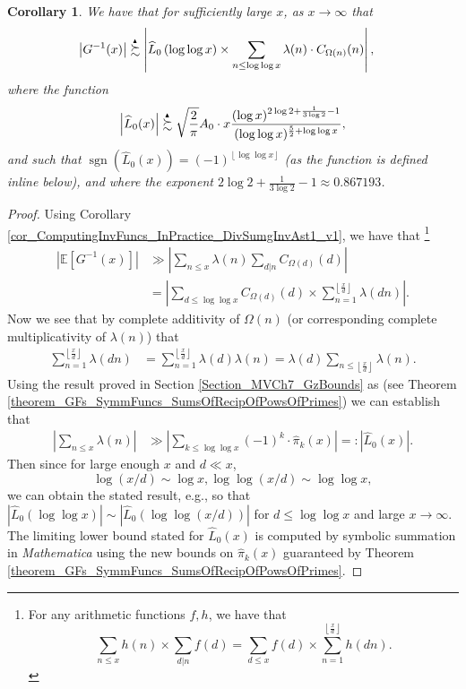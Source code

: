 \documentclass[11pt,reqno,a4letter]{article}
\numberwithin{figure}{section}
\numberwithin{table}{section}
\newcommand{\cf}{\textit{cf.\ }}
\newcommand{\floor}[1]{\left\lfloor #1 \right\rfloor}
\newcommand{\Floor}[2]{\ensuremath{\left\lfloor \frac{#1}{#2} \right\rfloor}}
\theoremstyle{plain}
\newtheorem{cor}[theorem]{Corollary}
\numberwithin{theorem}{section}
\theoremstyle{definition}
\newcommand{\NBRef}[1]{}
\newcommand{\SuccSim}[0]{\overset{_{\scriptsize{\blacktriangle}}}{\succsim}}
\begin{document}
\begin{cor} 
\label{cor_ASemiForm_ForGInvx_v1} 
We have that for sufficiently large $x$, as $x \rightarrow \infty$ that 
\begin{align*} 
\left\lvert G^{-1}(x) \right\rvert & \SuccSim 
     \left\lvert 
     \widehat{L}_0\left(\log\log x\right) \times \sum_{n \leq \log\log x} 
     \lambda(n) \cdot C_{\Omega(n)}(n) \right\rvert, 
\end{align*} 
where the function 
\[
\left\lvert \widehat{L}_0(x) \right\rvert \SuccSim 
     \sqrt{\frac{2}{\pi}} A_0 \cdot x 
     \frac{(\log x)^{2\log 2+ \frac{1}{3 \log 2} - 1}}{ 
     (\log\log x)^{\frac{5}{2} + \log\log x}}, 
\]
and such that $\operatorname{sgn}(\widehat{L}_0(x)) = (-1)^{\floor{\log\log x}}$ 
(as the function is defined inline below), and 
where the exponent $2\log 2+ \frac{1}{3 \log 2} - 1 \approx 0.867193$. 
\end{cor} 
\NBRef{A10-2020.04-26} 
\begin{proof} 
Using Corollary \ref{cor_ComputingInvFuncs_InPractice_DivSumgInvAst1_v1}, we have that \footnote{ 
     For any arithmetic functions $f,h$, we have that \cite[\cf \S 3.10; \S 3.12]{APOSTOLANUMT} 
     \[
     \sum_{n \leq x} h(n) \times \sum_{d|n} f(d) = \sum_{d \leq x} f(d) \times \sum_{n=1}^{\Floor{x}{d}} h(dn). 
     \] 
}
\begin{align*} 
\left\lvert \mathbb{E}[G^{-1}(x)] \right\rvert & \gg 
     \left\lvert \sum_{n \leq x} \lambda(n) \sum_{d|n} C_{\Omega(d)}(d) \right\rvert \\ 
     & = \left\lvert \sum_{d \leq \log\log x} C_{\Omega(d)}(d) \times 
     \sum_{n=1}^{\Floor{x}{d}} \lambda(dn) \right\rvert. 
\end{align*} 
Now we see that by complete additivity of $\Omega(n)$ 
(or corresponding complete multiplicativity of $\lambda(n)$) that 
\begin{align*} 
\sum_{n=1}^{\Floor{x}{d}} \lambda(dn) & = \sum_{n=1}^{\Floor{x}{d}} \lambda(d) \lambda(n) 
     = \lambda(d) \sum_{n \leq \Floor{x}{d}} \lambda(n). 
\end{align*} 
Using the result proved in Section \ref{Section_MVCh7_GzBounds} as 
(see Theorem \ref{theorem_GFs_SymmFuncs_SumsOfRecipOfPowsOfPrimes})
we can establish that 
\begin{align*} 
\left\lvert \sum_{n \leq x} \lambda(n) \right\rvert & \gg 
     \left\lvert \sum_{k \leq \log\log x} (-1)^k \cdot \widehat{\pi}_k(x) \right\rvert 
     =: \left\lvert \widehat{L}_0(x) \right\rvert. 
\end{align*} 
Then since for large enough $x$ and $d \ll x$, 
\[
\log(x/d) \sim \log x, \log\log(x/d) \sim \log\log x, 
\] 
we can obtain the stated result, e.g., so that 
$\left\lvert \widehat{L}_0(\log\log x) \right\rvert \sim 
 \left\lvert \widehat{L}_0(\log\log (x/d)) \right\rvert$ for $d \leq \log\log x$ and 
large $x \rightarrow \infty$. 
The limiting lower bound stated for $\widehat{L}_0(x)$ is computed by symbolic summation 
in \emph{Mathematica} using the new bounds on $\widehat{\pi}_k(x)$ guaranteed by 
Theorem \ref{theorem_GFs_SymmFuncs_SumsOfRecipOfPowsOfPrimes}. 
\end{proof} 
\end{document}
